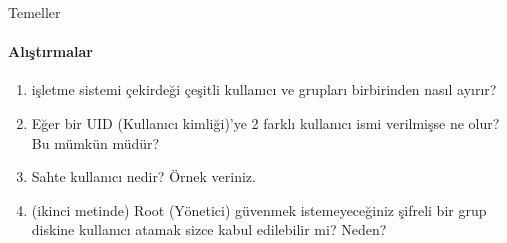 \begin{section}{Temeller}
\paragraph{{\Huge{\PencilLeftDown}}Alıştırmalar}{
\begin{enumerate}
\item işletme sistemi çekirdeği çeşitli kullanıcı ve grupları birbirinden nasıl ayırır?
\item Eğer bir UID (Kullanıcı kimliği)'ye 2 farklı kullanıcı ismi verilmişse ne olur? Bu mümkün müdür?
\item Sahte kullanıcı nedir? Örnek veriniz.
\item (ikinci metinde) Root (Yönetici) güvenmek istemeyeceğiniz şifreli bir grup diskine kullanıcı atamak sizce kabul edilebilir mi? Neden?
\end{enumerate}}
\end{section}
